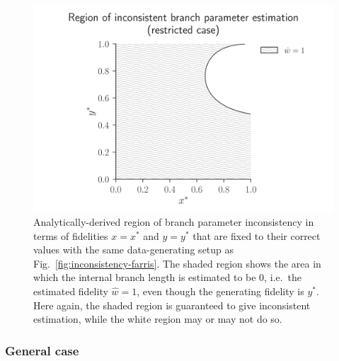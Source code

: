 \documentclass[11pt]{article}
\begin{document}
\begin{figure}
\centering
\includegraphics[width=\textwidth]{branch-length-inconsistency-inkscape}
\caption{Analytically-derived region of branch parameter inconsistency in terms of fidelities $x=x^*$ and $y=y^*$ that are fixed to their correct values with the same data-generating setup as Fig.~\ref{fig:inconsistency-farris}.
The shaded region shows the area in which the internal branch length is estimated to be 0, i.e.\ the estimated fidelity $\hat{w} = 1$, even though the generating fidelity is $y^*$.
Here again, the shaded region is guaranteed to give inconsistent estimation, while the white region may or may not do so.}
\label{fig:bl-inconsistency}
\end{figure}

\subsubsection*{General case}
\end{document}
